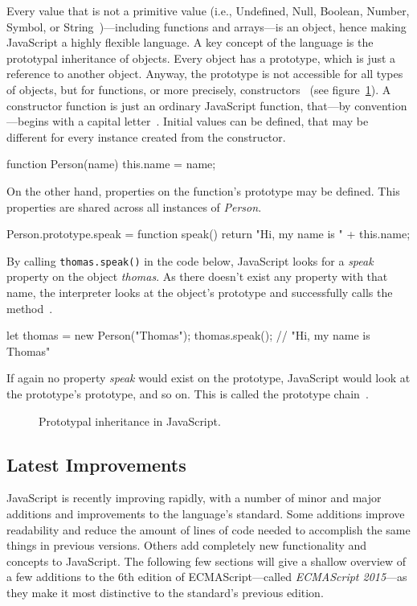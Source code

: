 Every value that is not a primitive value (i.e., Undefined, Null, Boolean, Number, Symbol, or String~\cite[p.~5]{ES6Spec:Ecma:2015})---including functions and arrays---is an object, hence making JavaScript a highly flexible language. A key concept of the language is the prototypal inheritance of objects. Every object has a prototype, which is just a reference to another object. Anyway, the prototype is not accessible for all types of objects, but for functions, or more precisely, constructors~\cite[p.~3]{ES6Spec:Ecma:2015} (see figure~\ref{fig:prototypal-inheritance}).
A constructor function is just an ordinary JavaScript function, that---by convention---begins with a capital letter~\cite[p.~8]{JavaScriptObjectProgramming:Rinehart:2015}. Initial values can be defined, that may be different for every instance created from the constructor.
\begin{JsCode}[numbers=none]
function Person(name) {
  this.name = name;
}
\end{JsCode}
On the other hand, properties on the function's prototype may be defined. This properties are shared across all instances of \emph{Person}.
\begin{JsCode}[numbers=none]
Person.prototype.speak = function speak() {
  return "Hi, my name is " + this.name;
}
\end{JsCode}
By calling \texttt{thomas.speak()} in the code below, JavaScript looks for a \emph{speak} property on the object \emph{thomas}. As there doesn't exist any property with that name, the interpreter looks at the object's prototype and successfully calls the method~\cite[pp.~85--86]{YDKJS:ThisAndObjectPrototypes:Simpson:2015}.
\begin{JsCode}[numbers=none]
let thomas = new Person("Thomas");
thomas.speak(); // "Hi, my name is Thomas"
\end{JsCode}
If again no property \emph{speak} would exist on the prototype, JavaScript would look at the prototype's prototype, and so on. This is called the prototype chain~\cite[p.~86]{YDKJS:ThisAndObjectPrototypes:Simpson:2015}.

\begin{figure}
\centering

\caption{Prototypal inheritance in JavaScript.}
\label{fig:prototypal-inheritance}
\end{figure}

\subsection{Latest Improvements}
JavaScript is recently improving rapidly, with a number of minor and major additions and improvements to the language's standard. Some additions improve readability and reduce the amount of lines of code needed to accomplish the same things in previous versions. Others add completely new functionality and concepts to JavaScript. The following few sections will give a shallow overview of a few additions to the 6th edition of ECMAScript---called \emph{ECMAScript 2015}---as they make it most distinctive to the standard's previous edition.

